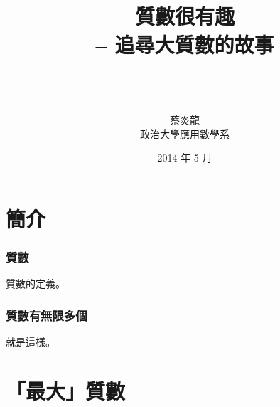 \documentclass[xcolor=svgnames,12pt,
]{beamer}
\title[質數很有趣 \hspace{4em}\insertframenumber/
\inserttotalframenumber]{~ \\ 質數很有趣\\
-- 追尋大質數的故事 \\~}
\author[蔡炎龍]{ \\ 蔡炎龍\\政治大學應用數學系}
\date{2014 年 5 月}
\begin{document}
%
\begin{frame}
\maketitle
\end{frame}

%
\begin{frame}
\tableofcontents 
\end{frame}

\section{簡介}
%
\begin{frame}
\frametitle{質數}

質數的定義。
\end{frame}


%
\begin{frame}
\frametitle{質數有無限多個}

就是這樣。
\end{frame}


%
\section{「最大」質數}
\end{document}
